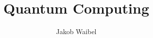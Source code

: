 \documentclass{scrarticle}
\begin{document}
\title{Quantum Computing}
\author{Jakob Waibel}
\date{}

\maketitle

\tableofcontents
\end{document}
